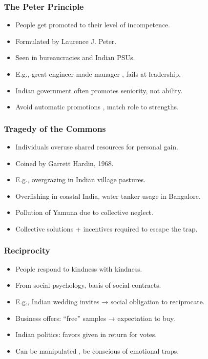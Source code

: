 \begin{frame}[fragile]\frametitle{The Peter Principle}
  \begin{itemize}
    \item People get promoted to their level of incompetence.
    \item Formulated by Laurence J. Peter.
    \item Seen in bureaucracies and Indian PSUs.
    \item E.g., great engineer made manager , fails at leadership.
    \item Indian government often promotes seniority, not ability.
    \item Avoid automatic promotions , match role to strengths.
  \end{itemize}
\end{frame}

\begin{frame}[fragile]\frametitle{Tragedy of the Commons}
  \begin{itemize}
    \item Individuals overuse shared resources for personal gain.
    \item Coined by Garrett Hardin, 1968.
    \item E.g., overgrazing in Indian village pastures.
    \item Overfishing in coastal India, water tanker usage in Bangalore.
    \item Pollution of Yamuna due to collective neglect.
    \item Collective solutions + incentives required to escape the trap.
  \end{itemize}
\end{frame}

\begin{frame}[fragile]\frametitle{Reciprocity}
  \begin{itemize}
    \item People respond to kindness with kindness.
    \item From social psychology, basis of social contracts.
    \item E.g., Indian wedding invites → social obligation to reciprocate.
    \item Business offers: ``free'' samples → expectation to buy.
    \item Indian politics: favors given in return for votes.
    \item Can be manipulated , be conscious of emotional traps.
  \end{itemize}
\end{frame}

